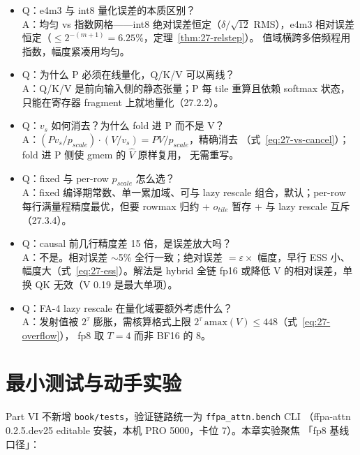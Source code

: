\begin{itemize}[itemsep=1pt,topsep=2pt]
  \item Q：e4m3 与 int8 量化误差的本质区别？\\
        A：均匀 vs 指数网格——int8 绝对误差恒定（$\delta/\sqrt{12}$ RMS），e4m3
        相对误差恒定（$\le 2^{-(m+1)} = 6.25\%$，定理~\ref{thm:27-relstep}）。
        值域横跨多倍频程用指数，幅度紧凑用均匀。
  \item Q：为什么 P 必须在线量化，Q/K/V 可以离线？\\
        A：Q/K/V 是前向输入侧的静态张量；P 每 tile 重算且依赖 softmax 状态，
        只能在寄存器 fragment 上就地量化（27.2.2）。
  \item Q：$v_s$ 如何消去？为什么 fold 进 P 而不是 V？\\
        A：$(P v_s / p_{scale}) \cdot (V / v_s) = PV / p_{scale}$，精确消去
        （式~\ref{eq:27-vs-cancel}）；fold 进 P 侧使 gmem 的 $\hat V$ 原样复用，
        无需重写。
  \item Q：fixed 与 per-row $p_{scale}$ 怎么选？\\
        A：fixed 编译期常数、单一累加域、可与 lazy rescale 组合，默认；per-row
        每行满量程精度最优，但要 rowmax 归约 + $o_{tile}$ 暂存 + 与 lazy rescale
        互斥（27.3.4）。
  \item Q：causal 前几行精度差 15 倍，是误差放大吗？\\
        A：不是。相对误差 $\sim$5\% 全行一致；绝对误差 $= \varepsilon \times$
        幅度，早行 ESS 小、幅度大（式~\ref{eq:27-ess}）。解法是 hybrid 全链
        fp16 或降低 V 的相对误差，单换 QK 无效（V 0.19 是最大单项）。
  \item Q：FA-4 lazy rescale 在量化域要额外考虑什么？\\
        A：发射值被 $2^{\tau}$ 膨胀，需核算格式上限
        $2^{\tau}\,\mathrm{amax}(V) \le 448$（式~\ref{eq:27-overflow}），
        fp8 取 $T{=}4$ 而非 BF16 的 8。
\end{itemize}

\section{最小测试与动手实验}

Part VI 不新增 \texttt{book/tests}，验证链路统一为 \texttt{ffpa\_attn.bench} CLI
（ffpa-attn 0.2.5.dev25 editable 安装，本机 PRO 5000，卡位 7）。本章实验聚焦
「fp8 基线口径」：

